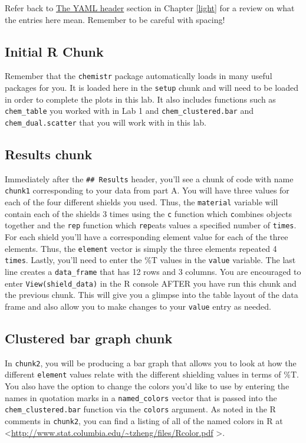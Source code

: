 \documentclass[]{tufte-book}
\begin{document}
Refer back to \protect\hyperlink{the-yaml-header}{The YAML header}
section in Chapter \ref{light} for a review on what the entries here
mean. Remember to be careful with spacing!

\subsection{Initial R Chunk}\label{initial-r-chunk-2}

Remember that the \texttt{chemistr} package automatically loads in many
useful packages for you. It is loaded here in the \texttt{setup} chunk
and will need to be loaded in order to complete the plots in this lab.
It also includes functions such as \texttt{chem\_table} you worked with
in Lab 1 and \texttt{chem\_clustered.bar} and
\texttt{chem\_dual.scatter} that you will work with in this lab.

\subsection{Results chunk}\label{results-chunk}

Immediately after the \texttt{\#\#\ Results} header, you'll see a chunk
of code with name \texttt{chunk1} corresponding to your data from part
A. You will have three values for each of the four different shields you
used. Thus, the \texttt{material} variable will contain each of the
shields 3 times using the \texttt{c} function which \texttt{c}ombines
objects together and the \texttt{rep} function which \texttt{rep}eats
values a specified number of \texttt{times}. For each shield you'll have
a corresponding element value for each of the three elements. Thus, the
\texttt{element} vector is simply the three elements repeated 4
\texttt{times}. Lastly, you'll need to enter the \%T values in the
\texttt{value} variable. The last line creates a \texttt{data\_frame}
that has 12 rows and 3 columns. You are encouraged to enter
\texttt{View(shield\_data)} in the R console AFTER you have run this
chunk and the previous chunk. This will give you a glimpse into the
table layout of the data frame and also allow you to make changes to
your \texttt{value} entry as needed.

\subsection{Clustered bar graph chunk}\label{clustered-bar-graph-chunk}

In \texttt{chunk2}, you will be producing a bar graph that allows you to
look at how the different \texttt{element} values relate with the
different shielding values in terms of \%T. You also have the option to
change the colors you'd like to use by entering the names in quotation
marks in a \texttt{named\_colors} vector that is passed into the
\texttt{chem\_clustered.bar} function via the \texttt{colors} argument.
As noted in the R comments in \texttt{chunk2}, you can find a listing of
all of the named colors in R at
\textless{}\url{http://www.stat.columbia.edu/~tzheng/files/Rcolor.pdf}
\textgreater{}.
\end{document}
